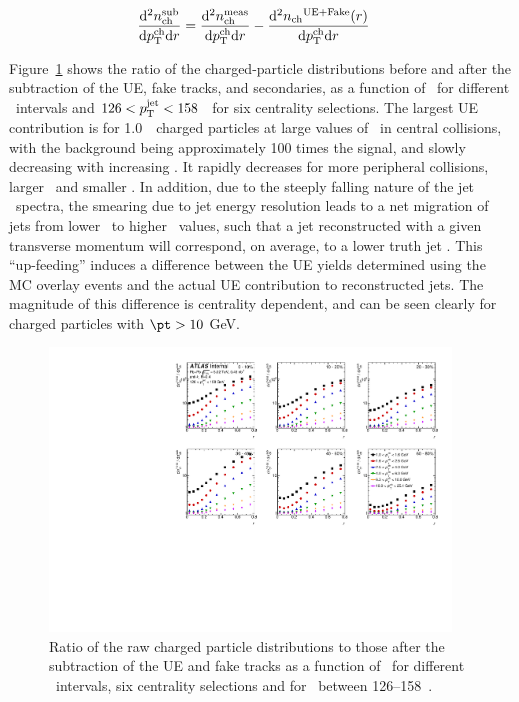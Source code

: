 \begin{align*}
\frac{\mathrm{d}^2 \mbox{$n_{\mathrm{ch}}^{\mathrm{sub}}$} }{ \mathrm{d} \mbox{$p_{\mathrm{T}}^{\mathrm{ch}}$} \mathrm{d} r } &=  \frac{\mathrm{d}^2 \mbox{$n_{\mathrm{ch}}^{\mathrm{meas}}$} }{ \mathrm{d} \mbox{$p_{\mathrm{T}}^{\mathrm{ch}}$} \mathrm{d} r} -  \frac{ \mathrm{d}^2 \mbox{$n_{\mathrm{ch}}$}^{\mathrm{UE+Fake}}(r)  }{ \mathrm{d} \mbox{$p_{\mathrm{T}}^{\mathrm{ch}}$} \mathrm{d} r} 
\end{align*}

Figure~\ref{fig:UEsize} shows the ratio of the charged-particle distributions before and after the subtraction of the UE, fake tracks, and secondaries,
 as a function of \rvar\ for different \pttrk\ intervals and $126 < \mbox{$p_{\mathrm{T}}^{\mathrm{jet}}$} < 158$ \GeV\ for six centrality selections. The largest UE contribution is for 1.0~\GeV\ charged particles at large values of \rvar\ in central collisions, with the background being approximately 100 times the signal, and slowly decreasing with increasing \ptjet. It rapidly decreases for more peripheral collisions, larger \pttrk\ and smaller \rvar. In addition, due to the steeply falling nature of the jet \pt\ spectra, the smearing due to jet energy resolution leads to a net migration of jets from lower \ptjet\ to higher \ptjet\ values, such that a jet reconstructed with a given transverse momentum will correspond, on average, to a lower truth jet \pT.  This ``up-feeding'' induces a difference between the UE yields determined using the MC overlay events and the actual UE contribution to reconstructed jets. The magnitude of this difference is centrality dependent, and can be seen clearly for charged particles with $\pt > 10$ GeV.

\begin{figure}
\centerline{
 \includegraphics[width=0.95\textwidth]{figures/performance/UE_B2S_single_0.pdf} }
\caption{ Ratio of the raw charged particle distributions to those after the subtraction of the UE and fake tracks as a function of \rvar\ for different \pttrk\ intervals, six centrality selections and for \ptjet\ between 126--158~\GeV.}
\label{fig:UEsize}
\end{figure}



